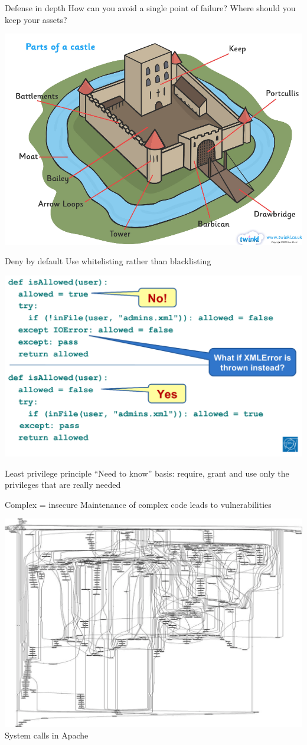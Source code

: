 \documentclass{beamer}
\begin{document}
\begin{frame}{Defense in depth}
How can you avoid a single point of failure? Where should you keep your assets?
\begin{center}
\includegraphics[width=0.7\linewidth]{castle.png}
\end{center}
\end{frame}

\begin{frame}{{\color{red}Deny by default}}
Use whitelisting rather than blacklisting
\begin{center}
\includegraphics[width=0.8\linewidth]{whitelisting.png}
\end{center}
\end{frame}

\begin{frame}{Least privilege principle}
“Need to know” basis: require, grant and use only the privileges that are really needed
\end{frame}

\begin{frame}{Complex = insecure}
Maintenance of complex code leads to vulnerabilities
\begin{center}
\includegraphics[width=0.6\linewidth]{complex.png} \newline
System calls in Apache
\end{center}
\end{frame}
\end{document}
